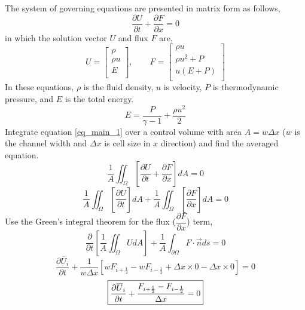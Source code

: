 \documentclass{article}
\begin{document}
The system of governing equations are presented in matrix form as follows,
\begin{equation}
\label{eq_main_1}
\dfrac{\partial U}{\partial t}+\dfrac{\partial F}{\partial x}=0
\end{equation}
in which the solution vector $U$ and flux $F$ are,
\begin{equation*}
U=
\left[
\begin{matrix}
\rho \\[10pt]
\rho u \\[10pt]
E \\
\end{matrix}
\right], \quad \quad
F=
\left[
\begin{matrix}
\rho u \\[10pt]
\rho u^2+ P\\[10pt]
u(E+P) \\
\end{matrix}
\right]
\end{equation*}
In these equations, $\rho$ is the fluid density, $u$ is velocity, $P$ is thermodynamic pressure, and $E$ is the total energy.
\begin{equation*}
E=\dfrac{P}{\gamma-1}+\dfrac{\rho u^2}{2}
\end{equation*}
Integrate equation \ref{eq_main_1} over a control volume with area $A=w \Delta x$ ($w$ is the channel width and $\Delta x$ is cell size in $x$ direction) and find the averaged equation.
\begin{equation*}
\dfrac{1}{A} \iint_{\Omega}\left[ \dfrac{\partial U}{\partial t}+\dfrac{\partial F}{\partial x} \right] dA=0
\end{equation*}
\begin{equation*}
\dfrac{1}{A} \iint_{\Omega}\left[ \dfrac{\partial U}{\partial t} \right] dA + \dfrac{1}{A} \iint_{\Omega}\left[\dfrac{\partial F}{\partial x} \right] dA=0
\end{equation*}
Use the Green's integral theorem for the flux ($\dfrac{\partial F}{\partial x}$) term,
\begin{equation*}
\dfrac{\partial }{\partial t} \left[ \dfrac{1}{A} \iint_{\Omega} U dA \right] + \dfrac{1}{A} \int_{\partial \Omega} F\cdot \vec{n} ds=0
\end{equation*}
\begin{equation*}
\dfrac{\partial \overline{U}_i}{\partial t} + \dfrac{1}{w \Delta x} \left[wF_{i+\frac{1}{2}}-wF_{i-\frac{1}{2}}+\Delta x\times 0-\Delta x\times 0\right]=0
\end{equation*}
\begin{equation}
\boxed{
\label{eq_main_2}
\dfrac{\partial \overline{U}_i}{\partial t} + \dfrac{F_{i+\frac{1}{2}}-F_{i-\frac{1}{2}}}{\Delta x}=0
}
\end{equation}
\end{document}
